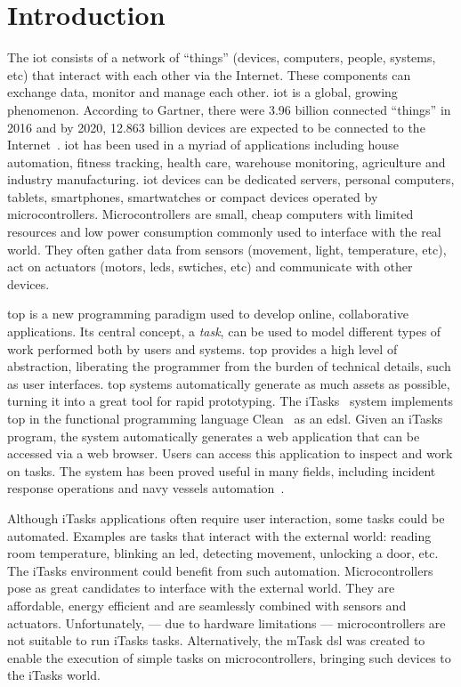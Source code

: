 \section{Introduction}
The \ac{iot} consists of a network of ``things'' (devices, computers, people, systems, etc) that interact with each other via the Internet. These components can exchange data, monitor and manage each other. \ac{iot} is a global, growing phenomenon. According to Gartner, there were 3.96 billion connected ``things'' in 2016 and by 2020, 12.863 billion devices are expected to be connected to the Internet~\cite{iot_numbers}. \ac{iot} has been used in a myriad of applications including house automation, fitness tracking, health care, warehouse monitoring, agriculture and industry manufacturing. \ac{iot} devices can be dedicated servers, personal computers, tablets, smartphones, smartwatches or compact devices operated by microcontrollers. Microcontrollers are small, cheap computers with limited resources and low power consumption commonly used to interface with the real world. They often gather data from sensors (movement, light, temperature, etc), act on actuators (motors, \acsp{led}, swtiches, etc) and communicate with other devices.

\ac{top} is a new programming paradigm used to develop online, collaborative applications. Its central concept, a \textit{task}, can be used to model different types of work performed both by users and systems. \ac{top} provides a high level of abstraction, liberating the programmer from the burden of technical details, such as user interfaces. \ac{top} systems automatically generate as much assets as possible, turning it into a great tool for rapid prototyping. The iTasks~\cite{top} system implements \ac{top} in the functional programming language Clean~\cite{clean} as an \ac{edsl}. Given an iTasks program, the system automatically generates a web application that can be accessed via a web browser. Users can access this application to inspect and work on tasks. The system has been proved useful in many fields, including incident response operations and navy vessels automation~\cite{incidone,navy}.

Although iTasks applications often require user interaction, some tasks could be automated. Examples are tasks that interact with the external world: reading room temperature, blinking an \acs{led}, detecting movement, unlocking a door,  etc. The iTasks environment could benefit from such automation. Microcontrollers pose as great candidates to interface with the external world. They are affordable, energy efficient and are seamlessly combined with sensors and actuators. Unfortunately, --- due to hardware limitations --- microcontrollers are not suitable to run iTasks tasks. Alternatively, the mTask \ac{dsl} was created to enable the execution of simple tasks on microcontrollers, bringing such devices to the iTasks world.


